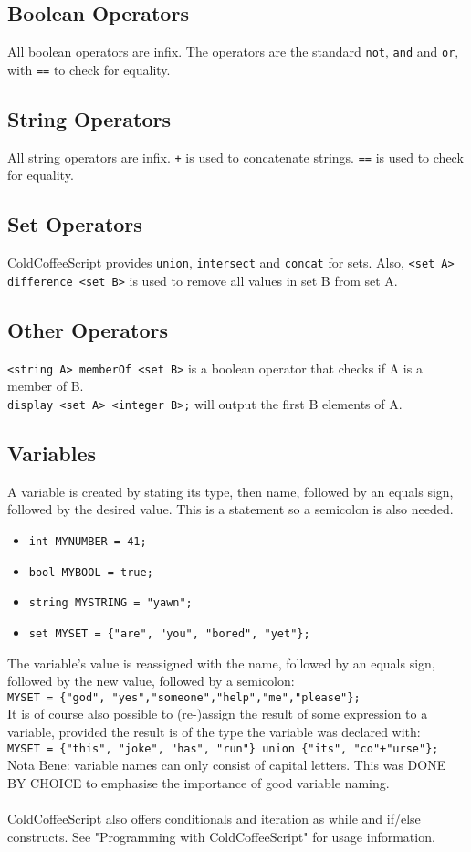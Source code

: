 \documentclass{article}
\begin{document}
\subsection{Boolean Operators}
All boolean operators are infix. The operators are the standard \lstinline|not|, \lstinline|and| and \lstinline|or|, with \lstinline|==| to check for equality.
\subsection{String Operators}
All string operators are infix. \lstinline|+| is used to concatenate strings. \lstinline|==| is used to check for equality.
\subsection{Set Operators}
ColdCoffeeScript provides \lstinline|union|, \lstinline|intersect| and \lstinline|concat| for sets. Also, \lstinline|<set A> difference <set B>| is used to remove all values in set B from set A.
\subsection{Other Operators}
\lstinline|<string A> memberOf <set B>| is a boolean operator that checks if A is a member of B.\\
\lstinline|display <set A> <integer B>;| will output the first B elements of A.
\subsection{Variables}
A variable is created by stating its type, then name, followed by an equals sign, followed by the desired value. This is a statement so a semicolon is also needed.
\begin{itemize}
\item \lstinline|int MYNUMBER = 41;|
\item \lstinline|bool MYBOOL = true;|
\item \lstinline|string MYSTRING = "yawn";|
\item \lstinline|set MYSET = {"are", "you", "bored", "yet"};|
\end{itemize}
The variable's value is reassigned with the name, followed by an equals sign, followed by the new value, followed by a semicolon: \\
\lstinline|MYSET = {"god", "yes","someone","help","me","please"};| \\
It is of course also possible to (re-)assign the result of some expression to a variable, provided the result is of the type the variable was declared with: \\
\lstinline|MYSET = {"this", "joke", "has", "run"} union {"its", "co"+"urse"};| \\
Nota Bene: variable names can only consist of capital letters. This was DONE BY CHOICE to emphasise the importance of good variable naming. \\\\
ColdCoffeeScript also offers conditionals and iteration as while and if/else constructs. See "Programming with ColdCoffeeScript" for usage information.
\end{document}
